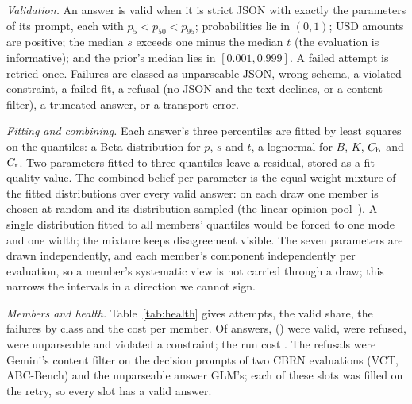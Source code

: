 \documentclass{article}
\begin{document}
\emph{Validation.} An answer is valid when it is strict JSON with exactly the parameters of its prompt, each with $p_5<p_{50}<p_{95}$; probabilities lie in $(0,1)$; USD amounts are positive; the median $s$ exceeds one minus the median $t$ (the evaluation is informative); and the prior's median lies in $[0.001,0.999]$. A failed attempt is retried once. Failures are classed as unparseable JSON, wrong schema, a violated constraint, a failed fit, a refusal (no JSON and the text declines, or a content filter), a truncated answer, or a transport error.

\emph{Fitting and combining.} Each answer's three percentiles are fitted by least squares on the quantiles: a Beta distribution for $p$, $s$ and $t$, a lognormal for $B$, $K$, $C_\mathrm{b}$ and $C_\mathrm{r}$. Two parameters fitted to three quantiles leave a residual, stored as a fit-quality value. The combined belief per parameter is the equal-weight mixture of the fitted distributions over every valid answer: on each draw one member is chosen at random and its distribution sampled (the linear opinion pool~\citep{stone1961opinionpool,clemen1999combining}). A single distribution fitted to all members' quantiles would be forced to one mode and one width; the mixture keeps disagreement visible. The seven parameters are drawn independently, and each member's component independently per evaluation, so a member's systematic view is not carried through a draw; this narrows the intervals in a direction we cannot sign.

\emph{Members and health.} Table~\ref{tab:health} gives attempts, the valid share, the failures by class and the cost per member. Of \voiAttempts{} answers, \voiValid{} (\voiValidShare) were valid, \voiInvalidRefusal{} were refused, \voiInvalidJson{} were unparseable and \voiInvalidConstraint{} violated a constraint; the run cost \voiUSD. The refusals were Gemini's content filter on the decision prompts of two CBRN evaluations (VCT, ABC-Bench) and the unparseable answer GLM's; each of these slots was filled on the retry, so every slot has a valid answer. %

\begin{table}[!htbp]
  \centering
  \caption{Elicitation health per member: attempts, share valid after the one retry, failures by class (unparseable JSON, wrong schema, violated constraint, failed fit, refusal, truncated answer, and the transport errors cli, http, api, provider and other), cost in USD.}
  \label{tab:health}
  \resizebox{\linewidth}{!}{}
\end{table}
\end{document}
